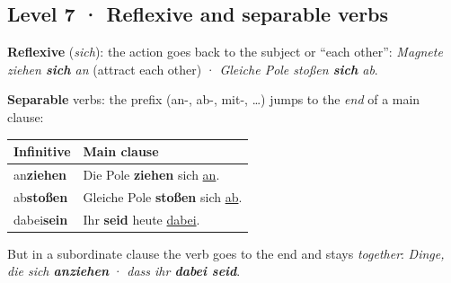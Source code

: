 \documentclass[10pt]{article}
\newcommand{\ex}[1]{\textit{#1}}
\begin{document}
\subsection*{Level 7 · Reflexive and separable verbs}
\textbf{Reflexive} (\emph{sich}): the action goes back to the subject or “each other”:
\ex{Magnete ziehen \textbf{sich} an} (attract each other) · \ex{Gleiche Pole stoßen \textbf{sich} ab}.
\par\textbf{Separable} verbs: the prefix (an-, ab-, mit-, …) jumps to the \emph{end} of a main clause:
\begin{center}
\begin{tabular}{|l|l|}
\hline\rowcolor{secc}\textbf{Infinitive} & \textbf{Main clause}\\\hline
an\textbf{ziehen} & Die Pole \textbf{ziehen} sich \underline{an}.\\
ab\textbf{stoßen} & Gleiche Pole \textbf{stoßen} sich \underline{ab}.\\
dabei\textbf{sein} & Ihr \textbf{seid} heute \underline{dabei}.\\\hline
\end{tabular}
\end{center}
But in a subordinate clause the verb goes to the end and stays \emph{together}: \ex{Dinge, die sich \textbf{anziehen}} · \ex{dass ihr \textbf{dabei seid}}.

\end{document}
